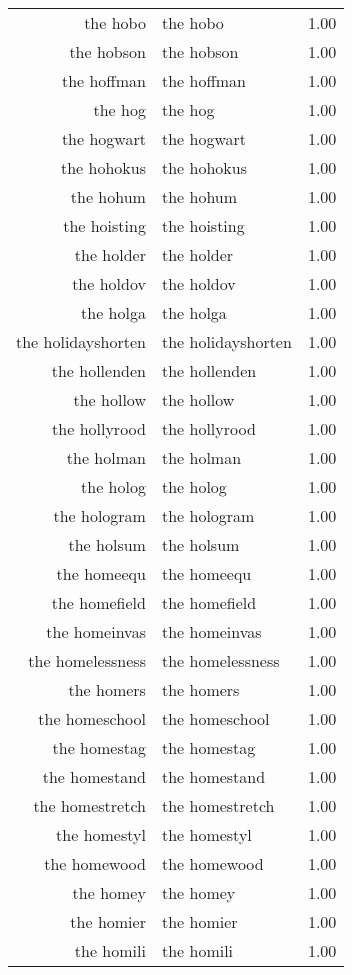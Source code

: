 \begin{table}[ht]
\begin{tabular}{rlr}
  the hobo & the hobo & 1.00 \\ 
  the hobson & the hobson & 1.00 \\ 
  the hoffman & the hoffman & 1.00 \\ 
  the hog & the hog & 1.00 \\ 
  the hogwart & the hogwart & 1.00 \\ 
  the hohokus & the hohokus & 1.00 \\ 
  the hohum & the hohum & 1.00 \\ 
  the hoisting & the hoisting & 1.00 \\ 
  the holder & the holder & 1.00 \\ 
  the holdov & the holdov & 1.00 \\ 
  the holga & the holga & 1.00 \\ 
  the holidayshorten & the holidayshorten & 1.00 \\ 
  the hollenden & the hollenden & 1.00 \\ 
  the hollow & the hollow & 1.00 \\ 
  the hollyrood & the hollyrood & 1.00 \\ 
  the holman & the holman & 1.00 \\ 
  the holog & the holog & 1.00 \\ 
  the hologram & the hologram & 1.00 \\ 
  the holsum & the holsum & 1.00 \\ 
  the homeequ & the homeequ & 1.00 \\ 
  the homefield & the homefield & 1.00 \\ 
  the homeinvas & the homeinvas & 1.00 \\ 
  the homelessness & the homelessness & 1.00 \\ 
  the homers & the homers & 1.00 \\ 
  the homeschool & the homeschool & 1.00 \\ 
  the homestag & the homestag & 1.00 \\ 
  the homestand & the homestand & 1.00 \\ 
  the homestretch & the homestretch & 1.00 \\ 
  the homestyl & the homestyl & 1.00 \\ 
  the homewood & the homewood & 1.00 \\ 
  the homey & the homey & 1.00 \\ 
  the homier & the homier & 1.00 \\ 
  the homili & the homili & 1.00 \\ 

\end{tabular}
\end{table}
